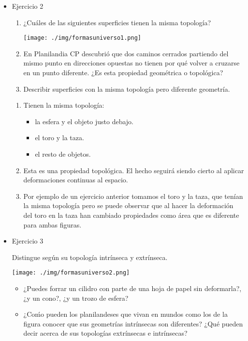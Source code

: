 \documentclass[11pt]{article}
\begin{document}
\begin{itemize}
\item Ejercicio 2
\label{sec-5-3-1-2}
\begin{statement}
\begin{enumerate}
\item ¿Cuáles de las siguientes superficies tienen la misma topología?

\texttt{[image: ./img/formasuniverso1.png]}

\item En Planilandia CP descubrió que dos caminos cerrados partiendo del mismo
punto en direcciones opuestas no tienen por qué volver a cruzarse en un
punto diferente. ¿Es esta propiedad geométrica o topológica?
\item Describir superficies con la misma topología pero diferente geometría.
\end{enumerate}
\end{statement}

\begin{enumerate}
\item Tienen la misma topología:
\begin{itemize}
\item la esfera y el objeto justo debajo.
\item el toro y la taza.
\item el resto de objetos.
\end{itemize}
\item Esta es una propiedad topológica. El hecho seguirá siendo cierto al
aplicar deformaciones continuas al espacio.
\item Por ejemplo de un ejercicio anterior tomamos el toro y la taza, que
tenían la misma topología pero se puede observar que al hacer la
deformación del toro en la taza han cambiado propiedades como área
que es diferente para ambas figuras.
\end{enumerate}

\item Ejercicio 3
\label{sec-5-3-1-3}
\begin{statement}
Distingue según su topología intrínseca y extrínseca.

\texttt{[image: ./img/formasuniverso2.png]}

\begin{itemize}
\item ¿Puedes forrar un cilidro con parte de una hoja de papel sin deformarla?,
¿y un cono?, ¿y un trozo de esfera?
\item ¿Coḿo pueden los planilandeses que vivan en mundos como los de la figura
conocer que sus geometrías intrínsecas son diferentes? ¿Qué pueden decir
acerca de sus topologías extrínsecas e intrínsecas?


\end{itemize}
\end{statement}
\end{itemize}
\end{document}
